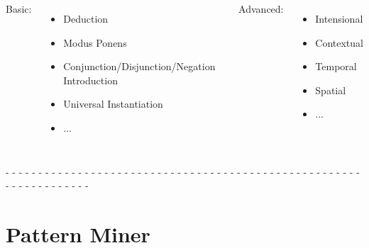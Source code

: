 \documentclass[aspectratio=169]{beamer}
\begin{document}
\begin{frame}



  \begin{columns}
    \column{4in}
    
    Basic:
    \begin{itemize}
    \item Deduction
    \item Modus Ponens
    \item Conjunction/Disjunction/Negation Introduction
    \item Universal Instantiation
    \item ...
    \end{itemize}
    
    \column{2in}
    
    Advanced:
    \begin{itemize}
    \item Intensional
    \item Contextual
    \item Temporal
    \item Spatial
    \item ...
    \end{itemize}
    
  \end{columns}


  - - - - - - - - - - - - - - - - - - - - - - - - - - - - - - - - - -
  - - - - - - - - - - - - - - - - - - - - - - - - - - - - - - - - -\\[0.1cm]

\end{frame}

\section{Pattern Miner}
\end{document}
